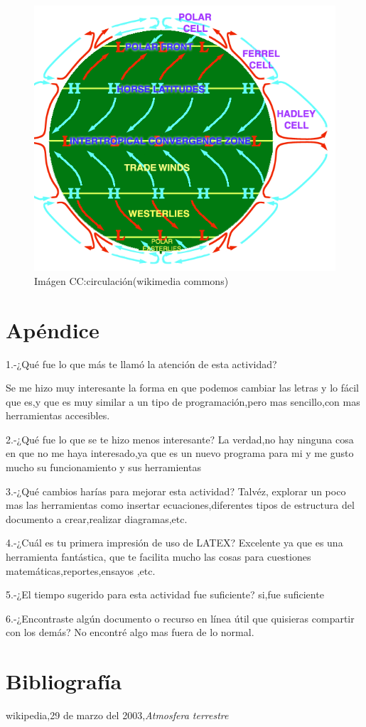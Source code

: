 \documentclass{article} %
\begin{document}
\begin{figure}[ht!]
  \includegraphics[width=\linewidth]{cielo5.png}
  \caption{Imágen CC:circulación(wikimedia commons)}
  \label{fig:cielo5}
\end{figure}




\section{Apéndice}
1.-¿Qué fue lo que más te llamó la atención de esta actividad?

Se me hizo muy interesante la forma en que podemos cambiar las letras y lo fácil que es,y que es muy similar a un tipo de programación,pero mas sencillo,con mas herramientas accesibles.


2.-¿Qué fue lo que se te hizo menos interesante?
La verdad,no hay ninguna cosa en que no me haya interesado,ya que es un nuevo programa para mi y me gusto mucho su funcionamiento y sus herramientas


3.-¿Qué cambios harías para mejorar esta actividad?
Talvéz, explorar un poco mas las herramientas como insertar ecuaciones,diferentes tipos de estructura del documento a crear,realizar diagramas,etc.


4.-¿Cuál es tu primera impresión de uso de LATEX?
Excelente ya que es una herramienta fantástica, que te facilita mucho las cosas para cuestiones matemáticas,reportes,ensayos ,etc.


5.-¿El tiempo sugerido para esta actividad fue suficiente?
si,fue suficiente


6.-¿Encontraste algún documento o recurso en línea útil que quisieras compartir con los demás?
No encontré algo mas fuera de lo normal.




\section{Bibliografía}

wikipedia,29 de marzo del 2003,\textit{Atmosfera terrestre}
\end{document}
